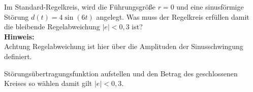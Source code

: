 \begin{question}[section=4,name={Regelabweichung},difficulty=,type=mdl,tags={}]
	Im Standard-Regelkreis, wird die Führungsgröße $r=0$ und eine sinusförmige Störung $d(t) = 4 \sin(6t)$ angelegt. Was muss der Regelkreis erfüllen damit die bleibende Regelabweichung $|e| < 0,3$ ist?
	\\ \textbf{Hinweis:}\\
	Achtung Regelabweichung ist hier über die Amplituden der Sinusschwingung definiert.
\end{question}
\begin{solution}
	Störungsübertragungsfunktion aufstellen und den Betrag des geschlossenen Kreises so wählen damit gilt $|e| < 0,3$.
\end{solution}